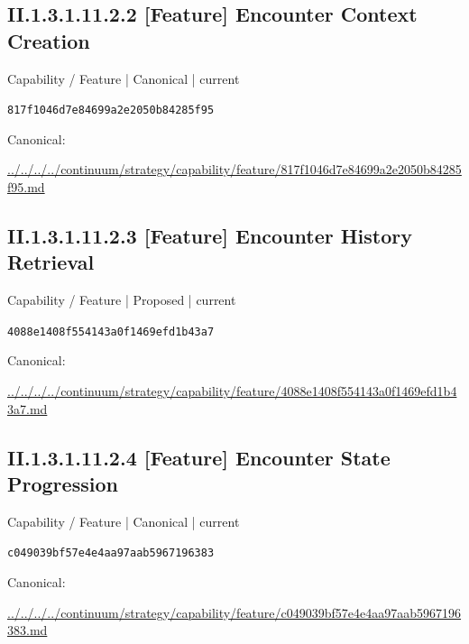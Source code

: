 \documentclass[10pt,a4paper]{article}
\begin{document}
\subsection*{II.1.3.1.11.2.2 [Feature] Encounter Context Creation}
\label{element-817f1046d7e84699a2e2050b84285f95}
{\small Capability / Feature | Canonical | current}\par
\texttt{817f1046d7e84699a2e2050b84285f95}\par
Canonical: \par
{\footnotesize\url{../../../../continuum/strategy/capability/feature/817f1046d7e84699a2e2050b84285f95.md}}\par
\subsection*{II.1.3.1.11.2.3 [Feature] Encounter History Retrieval}
\label{element-4088e1408f554143a0f1469efd1b43a7}
{\small Capability / Feature | Proposed | current}\par
\texttt{4088e1408f554143a0f1469efd1b43a7}\par
Canonical: \par
{\footnotesize\url{../../../../continuum/strategy/capability/feature/4088e1408f554143a0f1469efd1b43a7.md}}\par
\subsection*{II.1.3.1.11.2.4 [Feature] Encounter State Progression}
\label{element-c049039bf57e4e4aa97aab5967196383}
{\small Capability / Feature | Canonical | current}\par
\texttt{c049039bf57e4e4aa97aab5967196383}\par
Canonical: \par
{\footnotesize\url{../../../../continuum/strategy/capability/feature/c049039bf57e4e4aa97aab5967196383.md}}\par
\end{document}
